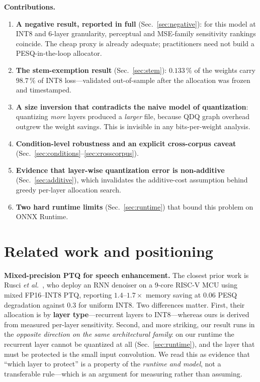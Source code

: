 \documentclass[conference]{IEEEtran}
\begin{document}
\textbf{Contributions.}
\begin{enumerate}
\item \textbf{A negative result, reported in full} (Sec.~\ref{sec:negative}): for this model at
INT8 and 6-layer granularity, perceptual and MSE-family sensitivity rankings coincide. The cheap
proxy is already adequate; practitioners need not build a PESQ-in-the-loop allocator.
\item \textbf{The stem-exemption result} (Sec.~\ref{sec:stem}): $0.133\,\%$ of the weights carry
$98.7\,\%$ of INT8 loss---validated out-of-sample after the allocation was frozen and timestamped.
\item \textbf{A size inversion that contradicts the naive model of quantization}: quantizing
\emph{more} layers produced a \emph{larger} file, because QDQ graph overhead outgrew the weight
savings. This is invisible in any bits-per-weight analysis.
\item \textbf{Condition-level robustness and an explicit cross-corpus caveat}
(Sec.~\ref{sec:conditions}--\ref{sec:crosscorpus}).
\item \textbf{Evidence that layer-wise quantization error is non-additive}
(Sec.~\ref{sec:additive}), which invalidates the additive-cost assumption behind greedy per-layer
allocation search.
\item \textbf{Two hard runtime limits} (Sec.~\ref{sec:runtime}) that bound this problem on ONNX
Runtime.
\end{enumerate}

\section{Related work and positioning}

\textbf{Mixed-precision PTQ for speech enhancement.} The closest prior work is Rusci \emph{et
al.}~\cite{rusci2022}, who deploy an RNN denoiser on a 9-core RISC-V MCU using mixed FP16--INT8
PTQ, reporting $1.4$--$1.7\times$ memory saving at $0.06$ PESQ degradation against $0.3$ for
uniform INT8. Two differences matter. First, their allocation is by \textbf{layer type}---recurrent
layers to INT8---whereas ours is derived from measured per-layer sensitivity. Second, and more
striking, our result runs in the \emph{opposite direction on the same architectural family}: on our
runtime the recurrent layer cannot be quantized at all (Sec.~\ref{sec:runtime}), and the layer that
must be protected is the small input convolution. We read this as evidence that ``which layer to
protect'' is a property of the \emph{runtime and model}, not a transferable rule---which is an
argument for measuring rather than assuming.
\end{document}
